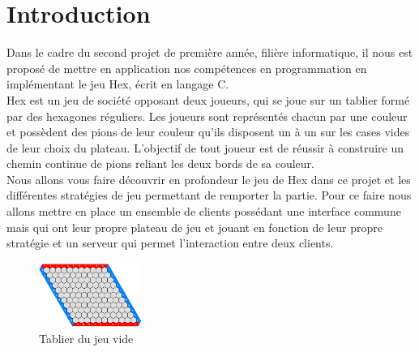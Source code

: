 \section{Introduction}
Dans le cadre du second projet de première année, filière informatique, il nous est proposé de mettre en application nos compétences en programmation en implémentant le jeu Hex, écrit en langage C.\\
Hex est un jeu de société opposant deux joueurs, qui se joue sur un tablier formé par des hexagones réguliers. Les joueurs sont représentés chacun par une couleur et possèdent des pions de leur couleur qu'ils disposent un à un sur les cases vides de leur choix du plateau. L'objectif de tout joueur est de réussir à construire un chemin continue de pions reliant les deux bords de sa couleur.\\
Nous allons vous faire découvrir en profondeur le jeu de Hex dans ce projet et les différentes stratégies de jeu permettant de remporter la partie. Pour ce faire nous allons mettre en place un ensemble de clients possédant une interface commune mais qui ont leur propre plateau de jeu et jouant en fonction de leur propre stratégie et un serveur qui permet l'interaction entre deux clients.


\begin{figure}[h]
    \centering
    \label{fig:Hexgraph}
    \includegraphics[width=0.3\textwidth]{Images/Hex.png}

    \caption{Tablier du jeu vide}
\end{figure}